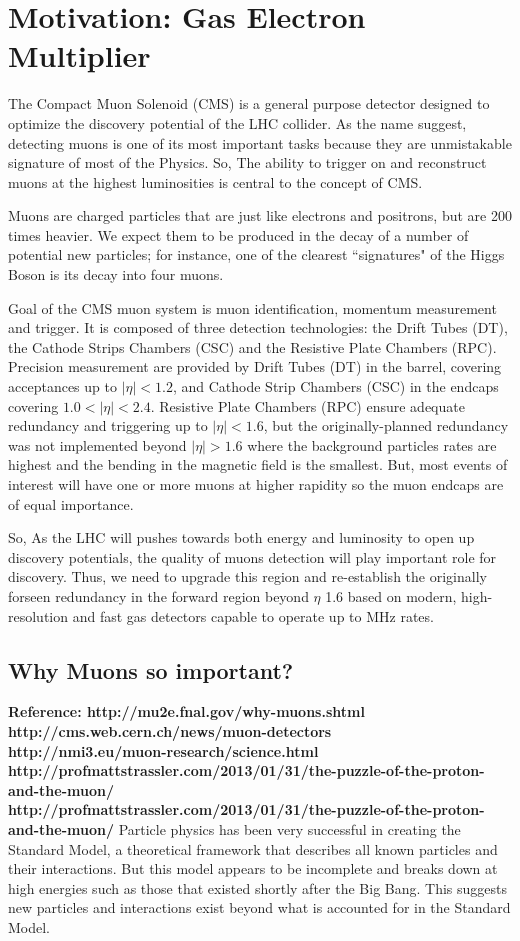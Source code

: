\chapter{Motivation: Gas Electron Multiplier}
The Compact Muon Solenoid (CMS) is a general purpose detector designed to optimize the discovery potential of the LHC collider. As the name suggest, detecting muons is one of its most important tasks because they are unmistakable signature of most of the Physics. So, The ability to trigger on and reconstruct muons at the highest luminosities is central to the concept of CMS.

Muons are charged particles that are just like electrons and positrons, but are 200 times heavier. We expect them to be produced in the decay of a number of potential new particles; for instance, one of the clearest ``signatures" of the Higgs Boson is its decay into four muons.

Goal of the CMS muon system is muon identification, momentum measurement and trigger. It is composed of three detection technologies:  the Drift Tubes (DT), the Cathode Strips Chambers (CSC) and the Resistive Plate Chambers (RPC). Precision measurement are provided by Drift Tubes (DT) in the barrel, covering acceptances up to $|\eta|<1.2$, and Cathode Strip Chambers (CSC) in the endcaps covering $1.0<|\eta|<2.4$. Resistive Plate Chambers (RPC) ensure adequate redundancy and triggering up to $|\eta|<1.6$, but the originally-planned redundancy was not implemented beyond $|\eta|>1.6$ where the background particles rates are highest and the bending in the magnetic field is the smallest. But, most events of interest will have one or more muons at higher rapidity so the muon endcaps are of equal importance.

So, As the LHC will pushes towards both energy and luminosity to open up discovery potentials, the quality of muons detection will play important role for discovery. Thus, we need to upgrade this region and re-establish the originally forseen redundancy in the forward region beyond $\eta$ 1.6 based on modern, high-resolution and fast gas detectors capable to operate up to MHz rates.

\section{Why Muons so important?}
{\bf Reference: http://mu2e.fnal.gov/why-muons.shtml \\ http://cms.web.cern.ch/news/muon-detectors\\http://nmi3.eu/muon-research/science.html\\http://profmattstrassler.com/2013/01/31/the-puzzle-of-the-proton-and-the-muon/\\http://profmattstrassler.com/2013/01/31/the-puzzle-of-the-proton-and-the-muon/}
Particle physics has been very successful in creating the Standard Model, a theoretical framework that describes all known particles and their interactions. But this model appears to be incomplete and breaks down at high energies such as those that existed shortly after the Big Bang. This suggests new particles and interactions exist beyond what is accounted for in the Standard Model.


